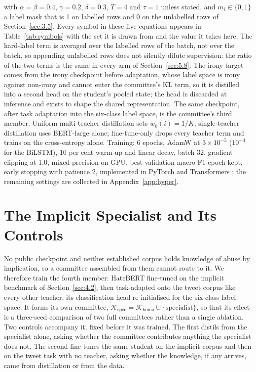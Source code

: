 with $\alpha = \beta = 0.4$, $\gamma = 0.2$, $\delta = 0.3$, $T = 4$ and $\tau = 1$ unless stated,
and $m_i \in \{0, 1\}$ a label mask that is 1 on labelled rows and 0 on the unlabelled rows of
Section~\ref{sec:3.5}. Every symbol in these five equations appears in Table~\ref{tab:symbols} with
the set it is drawn from and the value it takes here. The hard-label term is averaged over the
labelled rows of the batch, not over the batch, so appending unlabelled rows does not silently
dilute supervision: the ratio of the two terms is the same in every arm of Section~\ref{sec:5.8}.
The irony target comes from the irony checkpoint before adaptation, whose label space is irony
against non-irony and cannot enter the committee's KL term, so it is distilled into a second head on
the student's pooled state; the head is discarded at inference and exists to shape the shared
representation. The same checkpoint, after task adaptation into the six-class label space, is the
committee's third member. Uniform multi-teacher distillation sets $w_k(i) = 1/K$; single-teacher
distillation uses BERT-large alone; fine-tune-only drops every teacher term and trains on the
cross-entropy alone. Training: 6 epochs, AdamW \cite{loshchilov2019decoupled} at $3 \times 10^{-5}$
($10^{-3}$ for the BiLSTM), 10 per cent warm-up and linear decay, batch 32, gradient clipping at
1.0, mixed precision on GPU, best validation macro-F1 epoch kept, early stopping with patience 2,
implemented in PyTorch and Transformers \cite{paszke2019pytorch, wolf2020transformers}; the
remaining settings are collected in Appendix~\ref{app:hyper}.
\section{The Implicit Specialist and Its Controls}
\label{sec:3.4}
No public checkpoint and neither established corpus holds knowledge of abuse by implication, so a
committee assembled from them cannot route to it. We therefore train the fourth member: HateBERT
fine-tuned on the implicit benchmark of Section~\ref{sec:4.2}, then task-adapted onto the tweet
corpus like every other teacher, its classification head re-initialised for the six-class label
space. It forms its own committee, $\mathcal{K}_{\text{spec}} = \mathcal{K}_{\text{homo}} \cup
\{\text{specialist}\}$, so that its effect is a three-seed comparison of two full committees rather
than a single ablation. Two controls accompany it, fixed before it was trained. The first distils
from the specialist alone, asking whether the committee contributes anything the specialist does
not. The second fine-tunes the same student on the implicit corpus and then on the tweet task with
no teacher, asking whether the knowledge, if any arrives, came from distillation or from the data.
